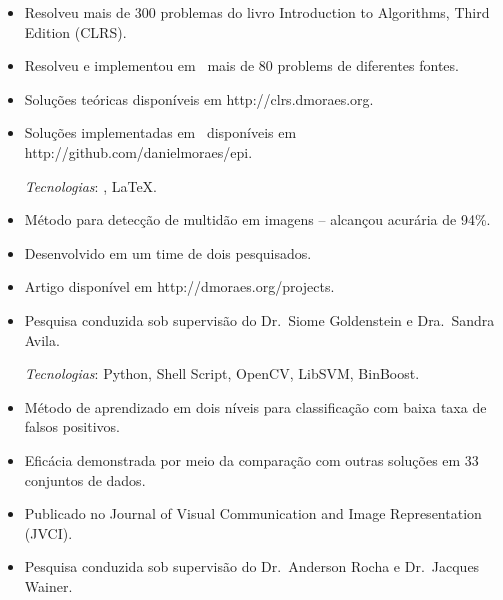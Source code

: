 \begin{resume}

\begin{position}
\vspace{1mm}
\begin{itemize}\small
\item Resolveu mais de 300 problemas do livro Introduction to Algorithms, Third Edition (CLRS).
\item Resolveu e implementou em \Cplusplus\ mais de 80 problems de diferentes fontes.
\item Solu\c{c}\~oes te\'oricas dispon\'iveis em http://clrs.dmoraes.org.
\item Solu\c{c}\~oes implementadas em \Cplusplus\ dispon\'iveis em http://github.com/danielmoraes/epi.

\vspace{1mm}
{\small \emph{Tecnologias}: \Cplusplus, \LaTeX.}
\end{itemize}
\end{position}


\begin{position}
\vspace{1mm}
\begin{itemize}\small
\item M\'etodo para detec\c{c}\~ao de multid\~ao em imagens {--} alcan\c{c}ou acur\'aria de 94\%.
\item Desenvolvido em um time de dois pesquisados.
\item Artigo dispon\'ivel em http://dmoraes.org/projects.
\item Pesquisa conduzida sob supervis\~ao do Dr.\ Siome Goldenstein e Dra.\
  Sandra Avila.

\vspace{1mm}
{\small \emph{Tecnologias}: Python, Shell Script, OpenCV, LibSVM, BinBoost.}
\end{itemize}
\end{position}

\dates{{\small 12/2012 {--} 02/2014}}

\begin{position}
\vspace{1mm}
\begin{itemize}\small
\item M\'etodo de aprendizado em dois n\'iveis para classifica\c{c}\~ao com baixa taxa de falsos positivos.
\item Efic\'acia demonstrada por meio da compara\c{c}\~ao com outras solu\c{c}\~oes em 33 conjuntos de dados.
\item Publicado no Journal of Visual Communication and Image Representation (JVCI).
\item Pesquisa conduzida sob supervis\~ao do Dr.\ Anderson Rocha e Dr.\ Jacques Wainer.


\end{itemize}
\end{position}
\end{resume}
